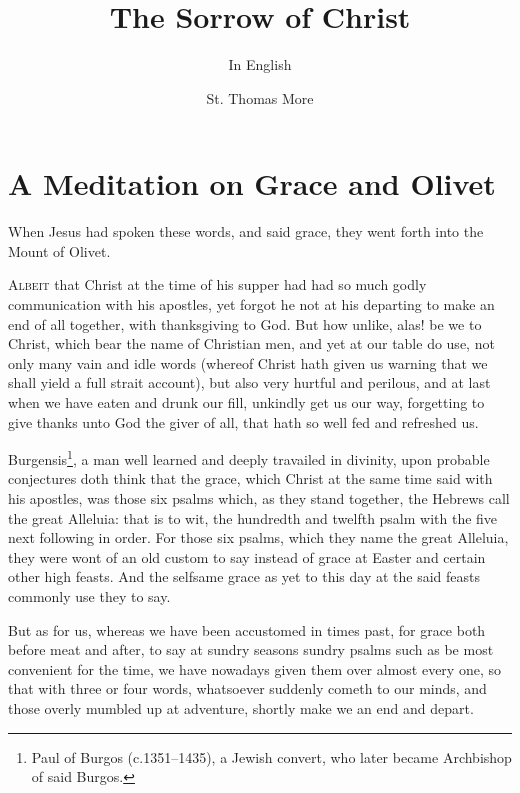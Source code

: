 \documentclass[a5paper]{scrbook}
\begin{document}
	\title{The Sorrow of Christ}
	\subtitle{In English}
	\author{St. Thomas More}
	\frontmatter
	\maketitle
	\tableofcontents
	\mainmatter
	\chapter{A Meditation on Grace and Olivet}
	
	\begin{scripture}[Matthew 26:30]
		When Jesus had spoken these words, and said grace, they went forth into the
		Mount of Olivet.
	\end{scripture}
	
	\vspace{10mm}
	
	\lettrine{A}{lbeit} that Christ at the time of his supper had had so much godly communication with his apostles, yet forgot he not at his departing to make an end of all together, with thanksgiving to God. But how unlike, alas! be we to Christ, which bear the name of Christian men, and yet at our table do use, not only many vain and idle words (whereof Christ hath given us warning that we shall yield a full strait account), but also very hurtful and perilous, and at last when we have eaten and drunk our fill, unkindly get us our way, forgetting to give thanks unto God the giver of all, that hath so well fed and refreshed us.
	
	Burgensis\footnote{Paul of Burgos (c.1351–1435), a Jewish convert, who later became Archbishop of said Burgos.}, a man well learned and deeply travailed in divinity, upon probable conjectures doth think that the grace, which Christ at the same time said with his apostles, was those six psalms which, as they stand together, the Hebrews call the great Alleluia: that is to wit, the hundredth and twelfth psalm with the five next following in order. For those six psalms, which they name the great Alleluia, they were wont of an old custom to say instead of grace at Easter and certain other high feasts. And the selfsame grace as yet to this day at the said feasts commonly use they to say.
	
	But as for us, whereas we have been accustomed in times past, for grace both before meat and after, to say at sundry seasons sundry psalms such as be most convenient for the time, we have nowadays given them over almost every one, so that with three or four words, whatsoever suddenly cometh to our minds, and those overly mumbled up at adventure, shortly make we an end and depart.
	
\end{document}

